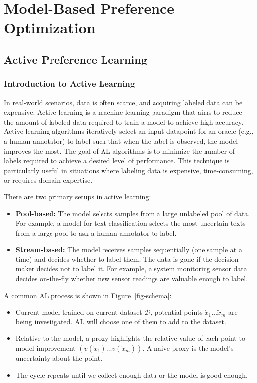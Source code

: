 \documentclass[
  letterpaper,
  numbers=noenddot,
  DIV=11]{scrreprt}
\let\oldchapter\chapter
\def\chapter{%
  \setcounter{sidenote}{1}%
  \oldchapter
}
\theoremstyle{definition}
\theoremstyle{plain}
\theoremstyle{plain}
\theoremstyle{remark}
\begin{document}

\chapter{Model-Based Preference Optimization}\label{ch-model-based}

\section{Active Preference Learning}\label{active-preference-learning}

\subsection{Introduction to Active
Learning}\label{introduction-to-active-learning}

In real-world scenarios, data is often scarce, and acquiring labeled
data can be expensive. Active learning is a machine learning paradigm
that aims to reduce the amount of labeled data required to train a model
to achieve high accuracy. Active learning algorithms iteratively select
an input datapoint for an oracle (e.g., a human annotator) to label such
that when the label is observed, the model improves the most. The goal
of AL algorithms is to minimize the number of labels required to achieve
a desired level of performance. This technique is particularly useful in
situations where labeling data is expensive, time-consuming, or requires
domain expertise.

There are two primary setups in active learning:

\begin{itemize}
\item
  \textbf{Pool-based:} The model selects samples from a large unlabeled
  pool of data. For example, a model for text classification selects the
  most uncertain texts from a large pool to ask a human annotator to
  label.
\item
  \textbf{Stream-based:} The model receives samples sequentially (one
  sample at a time) and decides whether to label them. The data is gone
  if the decision maker decides not to label it. For example, a system
  monitoring sensor data decides on-the-fly whether new sensor readings
  are valuable enough to label.
\end{itemize}

A common AL process is shown in Figure~\ref{fig-schema}:

\begin{itemize}
\item
  Current model trained on current dataset \(\mathcal{D}\), potential
  points \(\tilde{x}_1 \dots \tilde{x}_m\) are being investigated. AL
  will choose one of them to add to the dataset.
\item
  Relative to the model, a proxy highlights the relative value of each
  point to model improvement \((v(\tilde{x}_1) \dots v(\tilde{x}_m) )\).
  A naive proxy is the model's uncertainty about the point.
\item
  The cycle repeats until we collect enough data or the model is good
  enough.
\end{itemize}
\end{document}
